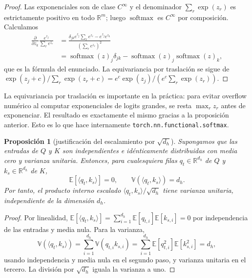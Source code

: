 \documentclass[11pt]{report}
\newenvironment{tcolorbox}[1][]{\par\medskip\noindent\ignorespaces}{\par\medskip}
\theoremstyle{definition}
\theoremstyle{plain}
\newtheorem{proposicion}[definicion]{Proposición}
\numberwithin{equation}{section}
\newcommand{\R}{\mathbb{R}}
\newcommand{\EE}{\mathbb{E}}
\newcommand{\VV}{\mathbb{V}}
\newcommand{\softmax}{\operatorname{softmax}}
\begin{document}
\begin{proof}
Las exponenciales son de clase \(C^\infty\) y el denominador \(\sum_r \exp(z_r)\) es estrictamente positivo en todo \(\R^m\); luego \(\softmax\) es \(C^\infty\) por composición. Calculamos
\begin{align*}
\frac{\partial}{\partial z_k}\frac{e^{z_j}}{\sum_r e^{z_r}}
&= \frac{\delta_{jk} e^{z_j}\sum_r e^{z_r}-e^{z_j}e^{z_k}}{(\sum_r e^{z_r})^2}\\
&= \softmax(z)_j\delta_{jk}-\softmax(z)_j\softmax(z)_k,
\end{align*}
que es la fórmula del enunciado. La equivariancia por traslación se sigue de
\(\exp(z_j+c)/\sum_r\exp(z_r+c)=e^c\exp(z_j)/(e^c\sum_r\exp(z_r))\).
\end{proof}

La equivariancia por traslación es importante en la práctica: para evitar overflow numérico al computar exponenciales de logits grandes, se resta \(\max_r z_r\) antes de exponenciar. El resultado es exactamente el mismo gracias a la proposición anterior. Esto es lo que hace internamente \texttt{torch.nn.functional.softmax}.

\begin{tcolorbox}[colback=blue!8, colframe=blue!8, boxrule=0pt]
\begin{proposicion}[justificación del escalamiento por \(\sqrt{d_h}\)]
Supongamos que las entradas de \(Q\) y \(K\) son independientes e idénticamente distribuidas con media cero y varianza unitaria. Entonces, para cualesquiera filas \(q_t\in\R^{d_h}\) de \(Q\) y \(k_s\in\R^{d_h}\) de \(K\),
\begin{equation*}
    \EE[\langle q_t,k_s\rangle]=0,
    \qquad
    \VV(\langle q_t,k_s\rangle)=d_h.
\end{equation*}
Por tanto, el producto interno escalado \(\langle q_t,k_s\rangle/\sqrt{d_h}\) tiene varianza unitaria, independiente de la dimensión \(d_h\).
\end{proposicion}
\end{tcolorbox}

\begin{proof}
Por linealidad, \(\EE[\langle q_t,k_s\rangle]=\sum_{i=1}^{d_h}\EE[q_{t,i}]\EE[k_{s,i}]=0\) por independencia de las entradas y media nula. Para la varianza,
\begin{equation*}
\VV(\langle q_t,k_s\rangle)
=\sum_{i=1}^{d_h}\VV(q_{t,i}k_{s,i})
=\sum_{i=1}^{d_h}\EE[q_{t,i}^2]\EE[k_{s,i}^2]
=d_h,
\end{equation*}
usando independencia y media nula en el segundo paso, y varianza unitaria en el tercero. La división por \(\sqrt{d_h}\) iguala la varianza a uno.
\end{proof}
\end{document}
